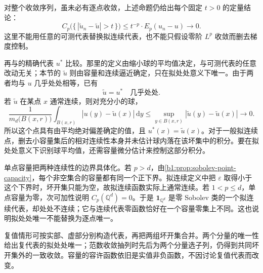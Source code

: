 对整个收敛序列，虽未必有逐点收敛，上述命题仍给出每个固定 \(t>0\) 的定量结论：
\[
 C_p\bigl(\{\,|\widetilde u_n-\widetilde u|>t\,\}\bigr)
 \leq t^{-p}\cdot E_p(u_n-u)\longrightarrow0.
\]
这里不能用任意的可测代表替换拟连续代表，也不能只假设零阶 \(L^p\) 收敛而删去梯度控制。

\ProseParagraphBreak

再与的精确代表 \(u^*\) 比较。那里的定义由缩小球的平均值决定，与可测代表的任意改动无关；本节的 \(\widetilde u\) 则由容量和连续逼近确定，只在拟处处意义下唯一。由于两者均与 \(u\) 几乎处处相等，已有
\[
 \widetilde u=u^*\quad\text{几乎处处}.
\]
若 \(\widetilde u\) 在某点 \(x\) 通常连续，则对充分小的球，
\[
 \frac1{m_d\bigl(B(x,r)\bigr)}
 \int_{B(x,r)}|u(y)-\widetilde u(x)|\,\mathrm dy
 \leq\sup_{y\in B(x,r)}
          |\widetilde u(y)-\widetilde u(x)|\longrightarrow0.
\]
所以这个点具有由平均绝对偏差确定的值，且 \(u^*(x)=\widetilde u(x)\)。对于一般拟连续点，删去小容量集后的相对连续性本身并未估计球内落在该坏集中的积分。要在拟处处意义下识别球平均值，还需容量微分估计来控制这部分积分。

\ProseParagraphBreak

单点容量把两种连续性的边界具体化。若 \(p>d\)，由\cref{b1:prop:sobolev-point-capacity}，每个非空集合的容量都有同一个正下界。拟连续定义中把 \(\varepsilon\) 取得小于这个下界时，坏开集只能为空，故拟连续函数实际上通常连续。若 \(1<p\leq d\)，单点容量为零，次可加性说明 \(C_p(\mathbb Q^d)=0\)。于是 \(\mathbf1_{\mathbb Q^d}\) 是零 Sobolev 类的一个拟连续代表，却处处不连续；它与连续代表零函数恰好在一个容量零集上不同。这也说明拟处处唯一不能替换为逐点唯一。

\ProseParagraphBreak

复值情形可按实部、虚部分别构造代表，再把两组坏开集合并。两个分量的唯一性给出复代表的拟处处唯一；范数收敛抽列时先后为两个分量选子列，仍得到共同坏开集外的一致收敛。容量的容许函数依旧是实值非负函数，不因讨论复值代表而改变。
